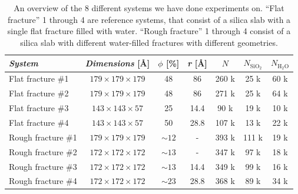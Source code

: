 \begin{table}[htpb]
\centering
    \begin{tabular}{l|cccccc}
    \textit{System}             & \textit{Dimensions} [\AA]     & $\phi$ [\%]   & \textit{r} [\AA]  & $N$       & $N_\text{SiO$_2$}$    & $N_\text{H$_2$O}$ \\ \hline 
    Flat fracture \#1           & $179 \times 179 \times 179$   & 48            & 86                & 260 k     & 25 k                  & 60 k                             \\ %
    Flat fracture \#2           & $179 \times 179 \times 179$   & 48            & 86                & 271 k     & 25 k                  & 64 k                             \\ %
    Flat fracture \#3           & $143 \times 143 \times 57$    & 25            & 14.4              & 90 k      & 19 k                  & 10 k                             \\ %
    Flat fracture \#4           & $143 \times 143 \times 57$    & 50            & 28.8              & 107 k     & 13 k                  & 22 k                             \\ %
    \hline %
    Rough fracture \#1          & $179 \times 179 \times 179$   & ${\sim}12$    & -                 & 393 k  & 111 k                    & 19 k           \\ %
    Rough fracture \#2          & $172 \times 172 \times 172$   & ${\sim}13$    & -                 & 347 k  & 97 k                     & 18 k            \\ %
    Rough fracture \#3          & $172 \times 172 \times 172$   & ${\sim}13$    & 14.4              & 349 k  & 99 k                     & 16 k            \\ %
    Rough fracture \#4          & $172 \times 172 \times 172$   & ${\sim}23$    & 28.8              & 368 k  & 89 k                     & 34 k            \\ %
    \end{tabular}%
    \vspace{8pt}
    \caption{%
        An overview of the 8 different systems we have done experiments on. ``Flat fracture'' 1 through 4 are reference systems, that consist of a silica slab with a single flat fracture filled with water. ``Rough fracture'' 1 through 4 consist of a silica slab with different water-filled fractures with different geometries.%
}
\end{table}
